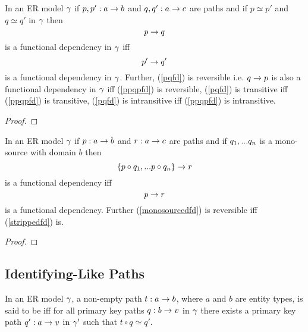 \begin{lemma}
In an ER model $\gamma$ if $p,p':a \rightarrow b$ and  $q, q': a \rightarrow c$ are paths and if $p \simeq p'$ and $q \simeq q'$ in $\gamma$
then 
\begin{equation}
\label{pqfd}
p \rightarrow q
\end{equation}
 is a functional dependency in $\gamma$ iff 
\begin{equation}
\label{ppqpfd}
p' \rightarrow q'
\end{equation}
 is a functional dependency in $\gamma$.
 Further, (\ref{pqfd}) is reversible i.e.
$q \rightarrow p$ is also a functional dependency in $\gamma$ iff (\ref{ppqpfd}) is reversible,
(\ref{pqfd}) is transitive iff (\ref{ppqpfd}) is transitive,
(\ref{pqfd}) is intransitive iff (\ref{ppqpfd}) is intransitive.
\end{lemma}
\begin{proof}
\tbd
\end{proof}

\begin{lemma}
In an ER model $\gamma$ if $p: a \rightarrow b$ and $r: a \rightarrow c$ are paths and if $q_1,...q_n$ is a mono-source with domain $b$
then 
\begin{equation}
\label{monosourcedfd}
\left\{p \circ q_1,...p \circ q_n\right\} \rightarrow r
\end{equation}
 is a functional dependency iff 
\begin{equation}
\label{strippedfd}
p \rightarrow r
\end{equation}
 is a functional dependency. Further (\ref{monosourcedfd}) is reversible iff (\ref{strippedfd}) is.
\end{lemma}
\begin{proof}
\tbd
\end{proof}


\subsection{Identifying-Like Paths}

\begin{definition}
In an ER model $\gamma$, a non-empty path $t: a \rightarrow b$, where $a$ and $b$ are entity types, is said to be  iff  for all primary key paths $q:b \rightarrow v$ in $\gamma$ there exists a primary key path $q':a \rightarrow v$ in $\gamma'$ such that $t \circ q \simeq q'$.
\end{definition}

